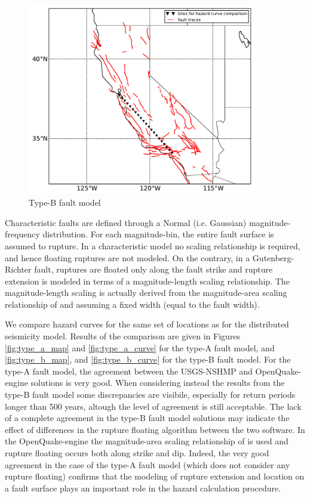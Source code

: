 \begin{figure}[htb]
\centering
\includegraphics[width=10cm]{./qareport/pictures/bFault_stitched_D2pt1_GR0.pdf}
\caption{Type-B fault model}
\label{fig:type_b_fault}
\end{figure}

Characteristic faults are defined through a Normal (i.e. Gaussian) magnitude-frequency distribution. For each magnitude-bin, the entire fault surface is assumed to rupture. In a characteristic model no scaling relationship is required, and hence floating ruptures are not modeled. On the contrary, in a Gutenberg-Richter fault, ruptures are floated only along the fault strike and rupture extension is modeled in terms of a magnitude-length scaling relationship. The magnitude-length scaling is actually derived from the magnitude-area scaling relationship of \citet{hanks2002} and assuming a fixed width (equal to the fault width).

We compare hazard curves for the same set of locations as for the distributed seismicity model. Results of the comparison are given in Figures \ref{fig:type_a_map} and \ref{fig:type_a_curve} for the type-A fault model, and \ref{fig:type_b_map}, and \ref{fig:type_b_curve} for the type-B fault model. For the type-A fault model, the agreement between the USGS-NSHMP and OpenQuake-engine solutions is very good. When considering instead the results from the type-B fault model some discrepancies are visibile, especially for return periods longer than 500 years, altough the level of agreement is still acceptable. The lack of a complete agreement in the type-B fault model solutions may indicate the effect of differences in the rupture floating algorithm between the two software. In the OpenQuake-engine the magnitude-area scaling relationship of \citet{wells1994} is used and rupture floating occurs both along strike and dip. Indeed, the very good agreement in the case of the type-A fault model (which does not consider any rupture floating) confirms that the modeling of rupture extension and location on a fault surface plays an important role in the hazard calculation procedure.


